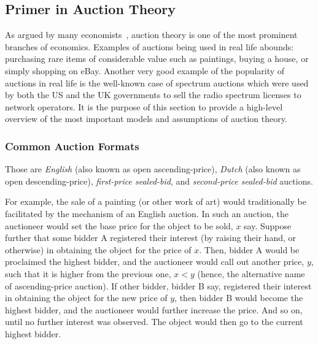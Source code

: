 \subsection{Primer in Auction Theory} %
\label{sub:primer_in_auction_theory_dmp}
As argued by many economists~\cite{Klemperer1999,Milgrom2004}, auction theory is one of the most prominent branches of economics. Examples of auctions being used in real life abounds: purchasing rare items of considerable value such as paintings, buying a house, or simply shopping on eBay. Another very good example of the popularity of auctions in real life is the well-known case of spectrum auctions which were used by both the US and the UK governments to sell the radio spectrum licenses to network operators. It is the purpose of this section to provide a high-level overview of the most important models and assumptions of auction theory.

\subsubsection{Common Auction Formats} %
\label{ssub:common_auction_formats_dmp}
 Those are \emph{English} (also known as open ascending-price), \emph{Dutch} (also known as open descending-price), \emph{first-price sealed-bid}, and \emph{second-price sealed-bid} auctions.

 For example, the sale of a painting (or other work of art) would traditionally be facilitated by the mechanism of an English auction. In such an auction, the auctioneer would set the base price for the object to be sold, $x$ say. Suppose further that some bidder A registered their interest (by raising their hand, or otherwise) in obtaining the object for the price of $x$. Then, bidder A would be proclaimed the highest bidder, and the auctioneer would call out another price, $y$, such that it is higher from the previous one, $x < y$ (hence, the alternative name of ascending-price auction). If other bidder, bidder B say, registered their interest in obtaining the object for the new price of $y$, then bidder B would become the highest bidder, and the auctioneer would further increase the price. And so on, until no further interest was observed. The object would then go to the current highest bidder.

